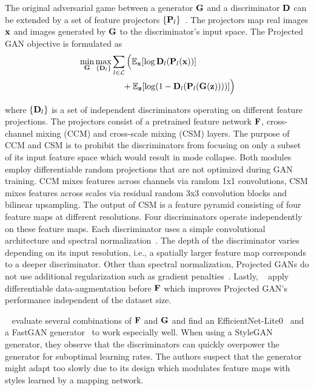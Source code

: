 The original adversarial game between a generator $\mathbf{G}$ and a discriminator $\mathbf{D}$ can be extended by a set of feature projectors $\{\mathbf{P}_l\}$~\cite{Sauer2021NEURIPS}. The projectors map real images $\mathbf{x}$ and images generated by $\mathbf{G}$ to the discriminator's input space. 
The Projected GAN objective is formulated as
\begin{equation}
\begin{aligned}
    \min_{\mathbf{G}} \max_{\{\mathbf{D}_l\}} &\sum_{l \in \mathcal{L}} \Big (
    \mathbb{E}_{\mathbf{x}} [\log \mathbf{D}_l(\mathbf{P}_l(\mathbf{x}))]\\ 
    &\quad \; + \mathbb{E}_{\mathbf{z}}[ \log( 1- \mathbf{D}_l(\mathbf{P}_l(\mathbf{G}(\mathbf{z}))))] \Big)
\end{aligned}
\end{equation}
\label{eq:GANobjective2}

where $\{\mathbf{D}_l\}$ is a set of independent discriminators operating on different feature projections.
The projectors consist of a pretrained feature network $\mathbf{F}$, cross-channel mixing (CCM) and cross-scale mixing (CSM) layers. 
The purpose of CCM and CSM is to prohibit the discriminators from focusing on only a subset of its input feature space which would result in mode collapse. Both modules employ differentiable random projections that are not optimized during GAN training. CCM mixes features across channels via random 1x1 convolutions, CSM mixes features across scales via residual random 3x3 convolution blocks and bilinear upsampling. The output of CSM is a feature pyramid consisting of four feature maps at different resolutions. Four discriminators operate independently on these feature maps. Each discriminator uses a simple convolutional architecture and spectral normalization~\cite{Miyato2018ICLR}. The depth of the discriminator varies depending on its input resolution, i.e., a spatially larger feature map corresponds to a deeper discriminator. Other than spectral normalization, Projected GANs do not use additional regularization such as gradient penalties~\cite{Mescheder2018ICML}. Lastly, ~\cite{Sauer2021NEURIPS} apply differentiable data-augmentation \cite{Zhao2020NeurIPS} before $\mathbf{F}$ which improves Projected GAN's performance independent of the dataset size.

~\cite{Sauer2021NEURIPS} evaluate several combinations of $\mathbf{F}$ and $\mathbf{G}$ and find an EfficientNet-Lite0~\cite{Tan2019ICML} and a FastGAN generator~\cite{Liu2021ICLR} to work especially well. When using a StyleGAN generator, they observe that the discriminators can quickly overpower the generator for suboptimal learning rates. The authors suspect that the generator might adapt too slowly due to its design which modulates feature maps with styles learned by a mapping network.


